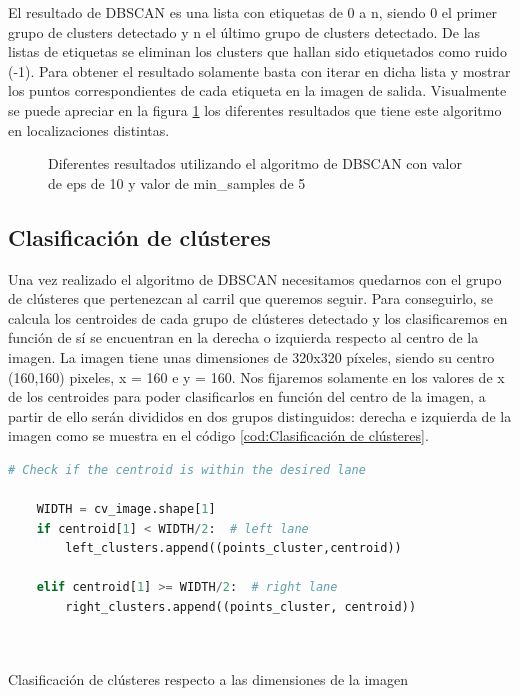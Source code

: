 El resultado de DBSCAN es una lista con etiquetas de 0 a n, siendo 0 el primer grupo de clusters detectado y 
n el último grupo de clusters detectado. De las listas de etiquetas se eliminan los clusters que hallan sido etiquetados como ruido (-1). Para obtener el resultado solamente basta con iterar en dicha lista y mostrar los puntos correspondientes de cada etiqueta en la imagen de salida.
Visualmente se puede apreciar en la figura \ref{f:Rresultadosdbscan} los diferentes resultados que tiene este algoritmo en localizaciones distintas. 

\begin{figure}[H]
  \begin{center}
  \caption{Diferentes resultados utilizando el algoritmo de DBSCAN con valor de eps de 10 y valor de min\_samples de 5}
  \label{f:Rresultadosdbscan}
  \end{center}
 \end{figure}



\subsection{Clasificación de clústeres}
\label{clasificación:cluster}
Una vez realizado el algoritmo de DBSCAN necesitamos quedarnos con el grupo de clústeres que pertenezcan al carril que queremos seguir. Para conseguirlo, se calcula los centroides de cada
grupo de clústeres detectado y los clasificaremos en función de sí se encuentran en la derecha o izquierda respecto al centro de la imagen. La imagen tiene unas dimensiones de 320x320 píxeles, 
siendo su centro (160,160) pixeles, x = 160 e y = 160. Nos fijaremos solamente en los valores de x de los centroides para poder clasificarlos en función del centro de la 
imagen, a partir de ello serán divididos en dos grupos distinguidos: derecha e izquierda de la imagen como se muestra en el código \ref{cod:Clasificación de clústeres}. \newline

\begin{code}[h]
  \begin{lstlisting}[language=Python]
    # Check if the centroid is within the desired lane

    WIDTH = cv_image.shape[1]
    if centroid[1] < WIDTH/2:  # left lane
        left_clusters.append((points_cluster,centroid))
       
    elif centroid[1] >= WIDTH/2:  # right lane
        right_clusters.append((points_cluster, centroid))
       
  
  \end{lstlisting}
  \caption[Clasificación de clústeres según las dimensiones de la imagen ]{Clasificación de clústeres respecto a las dimensiones de la imagen}
  \label{cod:Clasificación de clústeres}
  \end{code}  


